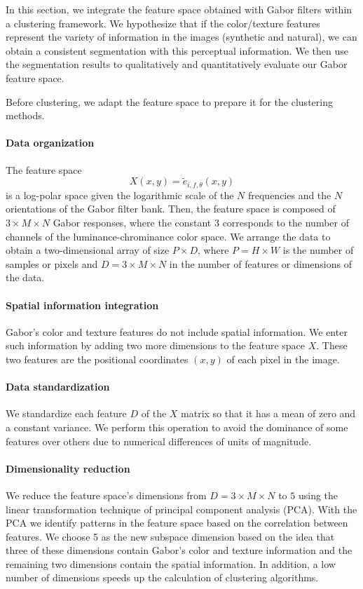 In this section, we integrate the feature space obtained with Gabor filters within a clustering framework. We hypothesize that if the color/texture features represent the variety of information in the images (synthetic and natural), we can obtain a consistent segmentation with this perceptual information. We then use the segmentation results to qualitatively and quantitatively evaluate our Gabor feature space.

Before clustering, we adapt the feature space to prepare it for the clustering methods.

\paragraph{Data organization}
The feature space 
\begin{equation}\label{eq:feature_space_clustering}
	X(x,y) = \widetilde{e}_{i, f, \theta}(x,y)
\end{equation}
is a log-polar space given the logarithmic scale of the $N$ frequencies and the $N$ orientations of the Gabor filter bank. Then, the feature space is composed of $3 \times M \times N$ Gabor responses, where the constant $3$ corresponds to the number of channels of the luminance-chrominance color space. We arrange the data to obtain a two-dimensional array of size $P \times D$, where $P= H\times W$  is the number of samples or pixels and $D =3 \times M \times N$ in the number of features or dimensions of the data.

\paragraph{Spatial information integration}
Gabor's color and texture features do not include spatial information. We enter such information by adding two more dimensions to the feature space $X$. These two features are the positional coordinates $(x, y)$ of each pixel in the image. 

\paragraph{Data standardization}
We standardize each feature $D$ of the $X$ matrix so that it has a mean of zero and a constant variance. We perform this operation to avoid the dominance of some features over others due to numerical differences of units of magnitude.

\paragraph{Dimensionality reduction}
We reduce the feature space's dimensions from $D =3 \times M \times N$ to $5$ using the linear transformation technique of principal component analysis (PCA). With the PCA we identify patterns in the feature space based on the correlation between features. We choose 5 as the new subspace dimension based on the idea that three of these dimensions contain Gabor's color and texture information and the remaining two dimensions contain the spatial information. In addition, a low number of dimensions speeds up the calculation of clustering algorithms.

